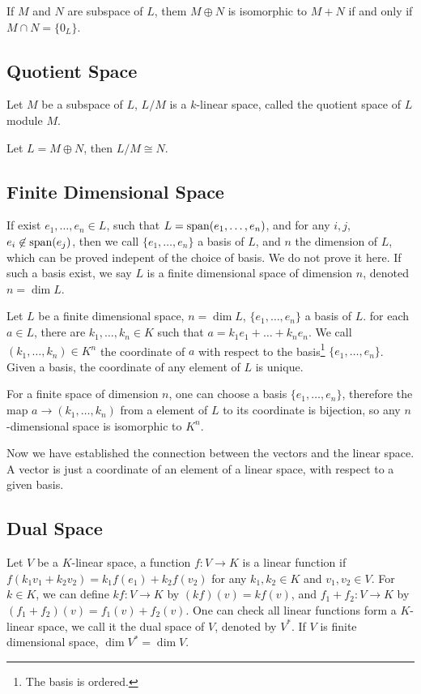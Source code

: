 If $M$ and $N$ are subspace of $L$, them $M\oplus N$ is isomorphic to $M + N$ if
and only if $M\cap N = \{0_L\}$.

\subsection{Quotient Space}
\begin{defi}
Let $M$ be a subspace of $L$, $L / M$ is a $k$-linear space,
called the quotient space of $L$ module $M$.
\end{defi}

\begin{exmp}
Let $L = M\oplus N$, then $L / M \cong N$.
\end{exmp}

\subsection{Finite Dimensional Space}
If exist $e_1, \dots, e_n \in L$, such that $L = \sp(e_1, \dots, e_n)$,
and for any $i, j$, $e_i \not\in \sp(e_j)$, then we call $\{e_1, \dots, e_n\}$ a basis of $L$,
and $n$ the dimension of $L$, which can be proved indepent of the choice of basis.
We do not prove it here.
If such a basis exist, we say $L$ is a finite dimensional space of dimension $n$, denoted $n = \dim L$.

Let $L$ be a finite dimensional space, $n = \dim L$, $\{e_1, \dots, e_n\}$ a basis of $L$.
for each $a \in L$, there are $k_1, \dots, k_n \in K$ such that $a = k_1e_1 + \dots + k_ne_n$.
We call $(k_1, \dots, k_n) \in K^n$ the coordinate of $a$ with respect to the
basis\footnote{The basis is ordered.} $\{e_1, \dots, e_n\}$.
Given a basis, the coordinate of any element of $L$ is unique.

For a finite space of dimension $n$, one can choose a basis $\{e_1, \dots, e_n\}$,
therefore the map $a \to (k_1, \dots, k_n)$ from a element of $L$ to its coordinate
is bijection, so any $n$-dimensional space is isomorphic to $K^n$.

Now we have established the connection between the vectors and the linear space.
A vector is just a coordinate of an element of a linear space, with respect to a given basis.

\subsection{Dual Space}
Let $V$ be a $K$-linear space, a function $f : V \to K$ is a linear function if
$f(k_1 v_1 + k_2 v_2) = k_1 f(e_1) + k_2 f(v_2)$ for any $k_1, k_2 \in K$ and $v_1, v_2 \in V$.
For $k \in K$, we can define $kf : V \to K$ by $(kf)(v) = k f(v)$,
and $f_1 + f_2 : V \to K$ by $(f_1 + f_2)(v) = f_1(v) + f_2(v)$.
One can check all linear functions form a $K$-linear space,
we call it the dual space of $V$, denoted by $V^\ast$.
If $V$ is finite dimensional space, $\dim V^\ast = \dim V$.

